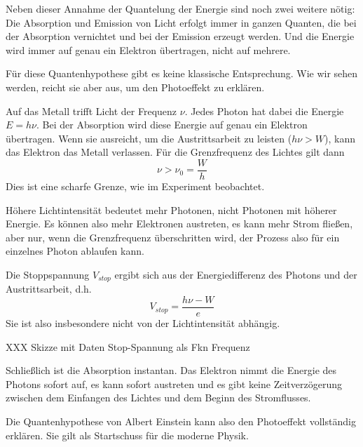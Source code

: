 Neben dieser Annahme der Quantelung der Energie sind noch zwei weitere nötig: Die Absorption und Emission von Licht erfolgt immer in ganzen Quanten, die bei der Absorption vernichtet und bei der Emission erzeugt werden. Und die Energie wird immer auf genau ein Elektron übertragen, nicht auf mehrere.

Für diese Quantenhypothese gibt es keine klassische Entsprechung. Wie wir sehen werden, reicht sie aber aus, um den Photoeffekt zu erklären.

Auf das Metall trifft Licht der Frequenz $\nu$. Jedes Photon hat dabei die Energie $E = h \nu$. Bei der Absorption wird diese Energie auf genau ein Elektron übertragen. Wenn sie ausreicht, um die Austrittsarbeit zu leisten ($h \nu > W$), kann das Elektron das Metall verlassen. Für die Grenzfrequenz des Lichtes gilt dann
 \begin{equation}
     \nu > \nu_0 = \frac{W}{h}
 \end{equation}
 Dies ist eine scharfe Grenze, wie im Experiment beobachtet.

 Höhere Lichtintensität bedeutet mehr Photonen, nicht Photonen mit höherer Energie. Es können also mehr Elektronen austreten, es kann mehr Strom fließen, aber nur, wenn die Grenzfrequenz überschritten wird, der Prozess also für ein einzelnes Photon ablaufen kann.

 Die Stoppspannung $V_{stop}$ ergibt sich aus der Energiedifferenz des Photons und der Austrittsarbeit, d.h. 
 \begin{equation}
     V_{stop} = \frac{h \nu - W}{e}
 \end{equation}
 Sie ist also insbesondere nicht von der Lichtintensität abhängig.

 \begin{marginfigure}
    \caption{XXX Skizze mit Daten Stop-Spannung als Fkn Frequenz}
   \end{marginfigure}


 Schließlich ist die Absorption instantan. Das Elektron nimmt die Energie des Photons sofort auf, es kann sofort austreten und es gibt keine Zeitverzögerung zwischen dem Einfangen des Lichtes und dem Beginn des Stromflusses.

 Die Quantenhypothese von Albert Einstein kann also den Photoeffekt vollständig erklären. Sie gilt als Startschuss für die moderne Physik.

